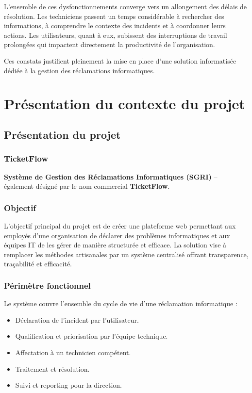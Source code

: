 \documentclass[12pt,a4paper,oneside]{report}
\begin{document}
L'ensemble de ces dysfonctionnements converge vers un allongement des délais de résolution. Les techniciens passent un temps considérable à rechercher des informations, à comprendre le contexte des incidents et à coordonner leurs actions. Les utilisateurs, quant à eux, subissent des interruptions de travail prolongées qui impactent directement la productivité de l'organisation.

Ces constats justifient pleinement la mise en place d'une solution informatisée dédiée à la gestion des réclamations informatiques.

\chapter{Présentation du contexte du projet}

\section{Présentation du projet}

\subsection{TicketFlow}

\textbf{Système de Gestion des Réclamations Informatiques (SGRI)} -- également désigné par le nom commercial \textbf{TicketFlow}.

\subsection{Objectif}

L'objectif principal du projet est de créer une plateforme web permettant aux employés d'une organisation de déclarer des problèmes informatiques et aux équipes IT de les gérer de manière structurée et efficace. La solution vise à remplacer les méthodes artisanales par un système centralisé offrant transparence, traçabilité et efficacité.

\subsection{Périmètre fonctionnel}

Le système couvre l'ensemble du cycle de vie d'une réclamation informatique :
\begin{itemize}
    \item Déclaration de l'incident par l'utilisateur.
    \item Qualification et priorisation par l'équipe technique.
    \item Affectation à un technicien compétent.
    \item Traitement et résolution.
    \item Suivi et reporting pour la direction.
\end{itemize}
\end{document}
